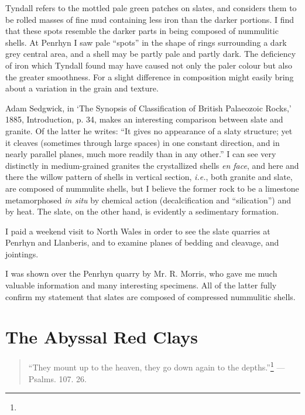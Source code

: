 \documentclass[a4paper, 12pt, oneside]{article}
\begin{document}
Tyndall refers to the mottled pale green patches on slates, and considers them to be rolled masses of fine mud containing less iron than the darker portions. I find that these spots resemble the darker parts in being composed of nummulitic shells. At Penrhyn I saw pale ``spots'' in the shape of rings surrounding a dark grey central area, and a shell may be partly pale and partly dark. The deficiency of iron which Tyndall found may have caused not only the paler colour but also the greater smoothness. For a slight difference in composition might easily bring about a variation in the grain and texture.

Adam Sedgwick, in `The Synopsis of Classification of British Palaeozoic Rocks,' 1885, Introduction, p. 34, makes an interesting comparison between slate and granite. Of the latter he writes: ``It gives no appearance of a slaty structure; yet it cleaves (sometimes through large spaces) in one constant direction, and in nearly parallel planes, much more readily than in any other.'' I can see very distinctly in medium-grained granites the crystallized shells \emph{en face}, and here and there the willow pattern of shells in vertical section, \emph{i.e.}, both granite and slate, are composed of nummulite shells, but I believe the former rock to be a limestone metamorphosed \emph{in situ} by chemical action (decalcification and ``silication'') and by heat. The slate, on the other hand, is evidently a sedimentary formation.

I paid a weekend visit to North Wales in order to see the slate quarries at Penrhyn and Llanberis, and to examine planes of bedding and cleavage, and jointings.

I was shown over the Penrhyn quarry by Mr. R. Morris, who gave me much valuable information and many interesting specimens. All of the latter fully confirm my statement that slates are composed of compressed nummulitic shells.
\clearpage
\section{The Abyssal Red Clays}
\begin{quote}
``They mount up to the heaven, they go down again to the depths.''\footnote{} --- Psalms. 107. 26.
\end{quote}
\end{document}
